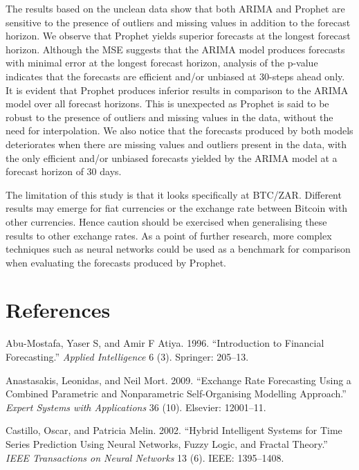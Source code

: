 \documentclass[12pt,a4paper]{article}
\numberwithin{equation}{section}
\numberwithin{figure}{section}
\numberwithin{table}{section}
\begin{document}
The results based on the unclean data show that both ARIMA and Prophet
are sensitive to the presence of outliers and missing values in addition
to the forecast horizon. We observe that Prophet yields superior
forecasts at the longest forecast horizon. Although the MSE suggests
that the ARIMA model produces forecasts with minimal error at the
longest forecast horizon, analysis of the p-value indicates that the
forecasts are efficient and/or unbiased at 30-steps ahead only. It is
evident that Prophet produces inferior results in comparison to the
ARIMA model over all forecast horizons. This is unexpected as Prophet is
said to be robust to the presence of outliers and missing values in the
data, without the need for interpolation. We also notice that the
forecasts produced by both models deteriorates when there are missing
values and outliers present in the data, with the only efficient and/or
unbiased forecasts yielded by the ARIMA model at a forecast horizon of
30 days.

The limitation of this study is that it looks specifically at BTC/ZAR.
Different results may emerge for fiat currencies or the exchange rate
between Bitcoin with other currencies. Hence caution should be exercised
when generalising these results to other exchange rates. As a point of
further research, more complex techniques such as neural networks could
be used as a benchmark for comparison when evaluating the forecasts
produced by Prophet.

\newpage

\section*{References}\label{references}

\hypertarget{refs}{}
\hypertarget{ref-abu1996}{}
Abu-Mostafa, Yaser S, and Amir F Atiya. 1996. ``Introduction to
Financial Forecasting.'' \emph{Applied Intelligence} 6 (3). Springer:
205--13.

\hypertarget{ref-anastasakis2009}{}
Anastasakis, Leonidas, and Neil Mort. 2009. ``Exchange Rate Forecasting
Using a Combined Parametric and Nonparametric Self-Organising Modelling
Approach.'' \emph{Expert Systems with Applications} 36 (10). Elsevier:
12001--11.

\hypertarget{ref-castillo2002}{}
Castillo, Oscar, and Patricia Melin. 2002. ``Hybrid Intelligent Systems
for Time Series Prediction Using Neural Networks, Fuzzy Logic, and
Fractal Theory.'' \emph{IEEE Transactions on Neural Networks} 13 (6).
IEEE: 1395--1408.
\end{document}
